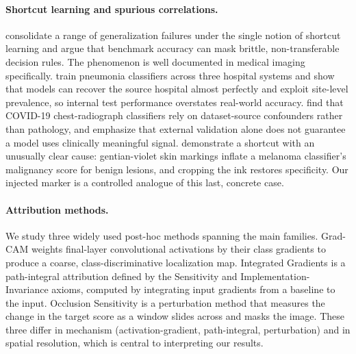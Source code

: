 \documentclass[11pt]{article}
\begin{document}
\paragraph{Shortcut learning and spurious correlations.}
\citet{geirhos2020shortcut} consolidate a range of generalization failures under the single notion
of shortcut learning and argue that benchmark accuracy can mask brittle, non-transferable decision
rules. The phenomenon is well documented in medical imaging specifically. \citet{zech2018variable}
train pneumonia classifiers across three hospital systems and show that models can recover the
source hospital almost perfectly and exploit site-level prevalence, so internal test performance
overstates real-world accuracy. \citet{degrave2021ai} find that COVID-19 chest-radiograph
classifiers rely on dataset-source confounders rather than pathology, and emphasize that external
validation alone does not guarantee a model uses clinically meaningful signal.
\citet{winkler2019association} demonstrate a shortcut with an unusually clear cause: gentian-violet
skin markings inflate a melanoma classifier's malignancy score for benign lesions, and cropping the
ink restores specificity. Our injected marker is a controlled analogue of this last, concrete case.

\paragraph{Attribution methods.}
We study three widely used post-hoc methods spanning the main families. Grad-CAM
\citep{selvaraju2017gradcam} weights final-layer convolutional activations by their class gradients
to produce a coarse, class-discriminative localization map. Integrated Gradients
\citep{sundararajan2017axiomatic} is a path-integral attribution defined by the Sensitivity and
Implementation-Invariance axioms, computed by integrating input gradients from a baseline to the
input. Occlusion Sensitivity \citep{zeiler2014visualizing} is a perturbation method that measures
the change in the target score as a window slides across and masks the image. These three differ in
mechanism (activation-gradient, path-integral, perturbation) and in spatial resolution, which is
central to interpreting our results.
\end{document}
